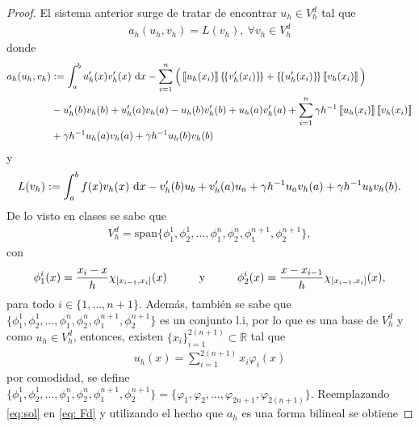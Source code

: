 \documentclass[10pt,a4paper]{report}
\newcommand{\dx}{\textup{d}x}
\providecommand{\salto}[1]{\left\llbracket#1\right\rrbracket}
\providecommand{\prom}[1]{\left \{\!\left \{#1\right \}\!\right \}}
\begin{document}
    \begin{proof}
    	El sistema anterior surge de tratar de encontrar $u_{h}\in V^{d}_{h}$ tal que
    	\begin{align}
    		a_{h}(u_{h},v_{h}) = L(v_{h}), \ \forall v_{h}\in V^{d}_{h} \label{eq: Fd}
    	\end{align}
        donde 
        \begin{align*}
        	a_{h}(u_{h},v_{h}) &:= \int_{a}^{b} u'_{h}(x)v'_{h}(x)\ \dx - \sum_{i=1}^{n}\Big(\salto{u_{h}(x_{i})}\prom{v'_{h}(x_{i})} + \prom{u'_{h}(x_{i})}\salto{v_{h}(x_{i})}\Big)\\
        	&-u'_{h}(b)v_{h}(b) + u'_{h}(a)v_{h}(a) - u_{h}(b)v'_{h}(b) + u_{h}(a)v'_{h}(a) + \sum_{i=1}^{n}\gamma h^{-1}\salto{u_{h}(x_{i})}\salto{v_{h}(x_{i})}\\
        	&+ \gamma h^{-1}u_{h}(a)v_{h}(a) + \gamma h^{-1}u_{h}(b)v_{h}(b)
        \end{align*}
        y 
        \begin{align*}
        	L(v_{h}) := \int_{a}^{b} f(x)v_{h}(x)\ \dx - v'_{h}(b)u_{b} + v'_{h}(a)u_{a} + \gamma h^{-1}u_{a}v_{h}(a) + \gamma h^{-1}u_{b}v_{h}(b).
        \end{align*}
        De lo visto en clases se sabe que 
        \begin{align*}
        	V^{d}_{h} = \text{span}\{\phi^{1}_{1},\phi^{1}_{2},\dots, \phi^{n}_{1},\phi^{n}_{2},\phi^{n+1}_{1},\phi^{n+1}_{2} \},
        \end{align*}
        con
        \begin{align*}
        	\phi^{i}_{1}(x) = \frac{x_{i}-x}{h}\chi_{[x_{i-1},x_{i}]}(x)\hspace{1cm} \textup{y} \hspace{1cm} \phi^{i}_{2}(x) = \frac{x-x_{i-1}}{h}\chi_{[x_{i-1},x_{i}]}(x),
        \end{align*}
        para todo $i\in\{1,\dots,n+1\}$. Además, también se sabe que $\{\phi^{1}_{1},\phi^{1}_{2},\dots, \phi^{n}_{1},\phi^{n}_{2},\phi^{n+1}_{1},\phi^{n+1}_{2} \}$ es un conjunto l.i, por lo que es una base de $V^{d}_{h}$ y como $u_{h}\in V^{d}_{h}$, entonces, existen $\{x_{i}\}^{2(n+1)}_{i=1}\subset \mathbb{R}$ tal que
        \begin{align}
        	u_{h}(x) = \sum_{i=1}^{2(n+1)} x_{i}\varphi_{i}(x)\label{eq:sol}
        \end{align}
        por comodidad, se define $\{\phi^{1}_{1},\phi^{1}_{2},\dots, \phi^{n}_{1},\phi^{n}_{2},\phi^{n+1}_{1},\phi^{n+1}_{2} \} = \{\varphi_{1},\varphi_{2},\dots,\varphi_{2n+1},\varphi_{2(n+1)}\}$. Reemplazando \eqref{eq:sol} en \eqref{eq: Fd} y utilizando el hecho que $a_{h}$ es una forma bilineal se obtiene 

\end{proof}
\end{document}
